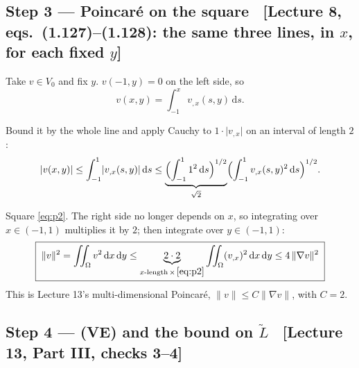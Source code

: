 \documentclass[11pt]{article}
\newcommand{\dxdy}{\,\mathrm{d}x\,\mathrm{d}y}
\newcommand{\norm}[1]{\lVert #1\rVert}
\newcommand{\abs}[1]{\lvert #1\rvert}
\newcommand{\Om}{\Omega}
\newcommand{\grad}{\nabla}
\newcommand{\Iint}{\iint_{\Om}}
\newcommand{\src}[1]{{\small\color{black!55}\textsf{[#1]}}}
\begin{document}
\subsection*{Step 3 --- Poincar\'e on the square
  \ \src{Lecture 8, eqs.~(1.127)--(1.128): the same three lines, in $x$, for
         each fixed $y$}}

\begin{steps}
\item Take $v\in V_{0}$ and fix $y$.  $v(-1,y)=0$ on the left side, so
\begin{equation}\label{eq:p1}
  v(x,y)=\int_{-1}^{x}v_{,x}(s,y)\,\mathrm{d}s .
\end{equation}
\item Bound it by the whole line and apply Cauchy to $1\cdot\abs{v_{,x}}$ on an
      interval of length $2$:
\begin{equation}\label{eq:p2}
  \abs{v(x,y)}\le\int_{-1}^{1}\abs{v_{,x}(s,y)}\,\mathrm{d}s
  \le\underbrace{\Bigl(\int_{-1}^{1}1^{2}\,\mathrm{d}s\Bigr)^{1/2}}_{\sqrt2}
     \Bigl(\int_{-1}^{1}v_{,x}(s,y)^{2}\,\mathrm{d}s\Bigr)^{1/2} .
\end{equation}
\item Square \eqref{eq:p2}.  The right side no longer depends on $x$, so
      integrating over $x\in(-1,1)$ multiplies it by $2$; then integrate over
      $y\in(-1,1)$:
\begin{equation}\label{eq:poinc}
  \boxed{\;\norm{v}^{2}=\Iint v^{2}\dxdy\le
  \underbrace{2\cdot2}_{x\text{-length}\,\times\,\eqref{eq:p2}}\Iint(v_{,x})^{2}\dxdy
  \le4\,\norm{\grad v}^{2}\;}
\end{equation}
      This is Lecture 13's multi-dimensional Poincar\'e,
      $\norm{v}\le C\norm{\grad v}$, with $C=2$.
\end{steps}

\subsection*{Step 4 --- (VE) and the bound on $\widetilde{L}$
  \ \src{Lecture 13, Part III, checks 3--4}}
\end{document}

